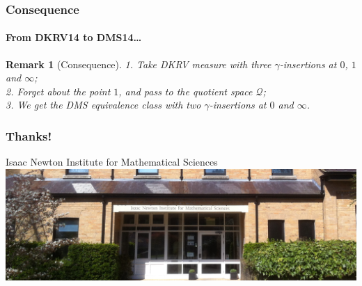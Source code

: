 \documentclass[aspectratio=169]{beamer}
\newtheorem{remark}[theorem]{Remark}
\begin{document}
\begin{frame}
\frametitle{Consequence}
\framesubtitle{From DKRV14 to DMS14\dots}
\begin{remark}[Consequence]
1. Take DKRV measure with three $\gamma$-insertions at $0$, $1$ and $\infty$;\\
2. Forget about the point $1$, and pass to the quotient space $\mathcal{Q}$;\\
3. We get the DMS equivalence class with two $\gamma$-insertions at $0$ and $\infty$.
\end{remark}
\end{frame}

\begin{frame}
\frametitle{Thanks!}
\begin{block}{Isaac Newton Institute for Mathematical Sciences}
\includegraphics[width=\textwidth]{INI.png}
\end{block}
\end{frame}
\end{document}

